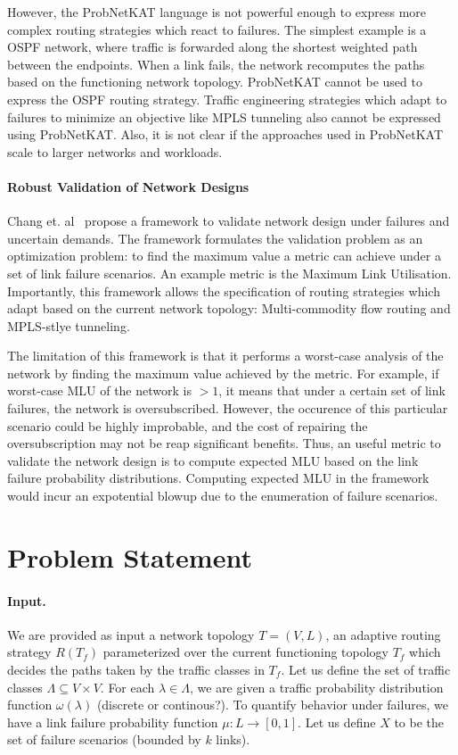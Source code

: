 \documentclass[]{article}
\begin{document}
However, the ProbNetKAT language is not powerful enough to 
express more complex routing strategies which react to failures. 
The simplest example is a OSPF network, where traffic is 
forwarded along the shortest weighted path between the endpoints. 
When a link fails, the network recomputes the paths based on the 
functioning network topology. ProbNetKAT cannot be used to express
the OSPF routing strategy. Traffic engineering strategies which adapt 
to failures to minimize an objective like MPLS tunneling also 
cannot be expressed using ProbNetKAT. Also, it is not clear 
if the approaches used in ProbNetKAT scale to larger networks 
and workloads.

\paragraph{Robust Validation of Network Designs}
Chang et. al~\cite{robustvalidation} propose a framework 
to validate network design under failures and uncertain demands. 
The framework formulates the validation problem as an 
optimization problem: to find the maximum value a metric can
achieve under a set of link failure scenarios. An example 
metric is the Maximum Link Utilisation. Importantly,
this framework allows the specification of routing strategies
which adapt based on the current network topology: Multi-commodity
flow routing and MPLS-stlye tunneling. 

The limitation of this framework is that it performs a 
worst-case analysis of the network by finding the maximum value 
achieved by the metric. For example, if worst-case 
MLU of the network is $> 1$,
it means that under a certain set of link failures, the network is
oversubscribed. However, the occurence of this particular scenario
could be highly improbable, and the cost of repairing the 
oversubscription may not be reap significant benefits. 
Thus, an useful metric
to validate the network design is to 
compute expected MLU based on the 
link failure probability distributions. 
Computing expected 
MLU in the framework 
would incur an expotential blowup due to the
enumeration of failure scenarios.

\section{Problem Statement}
\paragraph{Input.} We are provided as input a 
network topology $T=(V,L)$, an adaptive 
routing strategy $R(T_f)$
parameterized over the current functioning topology $T_f$
which decides the paths taken by the traffic classes
in $T_f$. Let us define the 
set of traffic classes $\Lambda 
\subseteq V \times V$. For each $\lambda \in \Lambda$,
we are given a traffic probability 
distribution function 
$\omega(\lambda)$
(discrete or continous?). To quantify behavior under
failures, we have a link failure probability function
$\mu: L \rightarrow [0,1]$. Let us define $X$ to be 
the set of failure scenarios (bounded by $k$ links).
\end{document}
